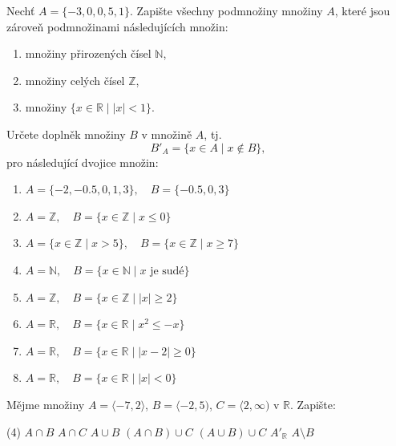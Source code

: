\documentclass[12pt,a4paper]{article}
\begin{document}
\begin{exercise}
Nechť $A = \{-3,0,0{,}5,1\}$.  
Zapište všechny podmnožiny množiny $A$, které jsou zároveň podmnožinami následujících množin:
\begin{enumerate}[label=\alph*)]
    \item množiny přirozených čísel $\mathbb{N}$,
    \item množiny celých čísel $\mathbb{Z}$,
    \item množiny $\{x \in \mathbb{R} \mid |x| < 1\}$.
\end{enumerate}
\end{exercise}


\setcounter{section}{2}
\begin{exercise}
Určete doplněk množiny $B$ v množině $A$, tj.
\[
B'_A = \{x \in A \mid x \notin B\},
\]
pro následující dvojice množin:
\begin{enumerate}[label=\alph*)]
    \item $A = \{-2,-0.5,0,1,3\}, \quad B = \{-0.5,0,3\}$
    \item $A = \mathbb{Z}, \quad B = \{x \in \mathbb{Z} \mid x \leq 0\}$
    \item $A = \{x \in \mathbb{Z} \mid x > 5\}, \quad B = \{x \in \mathbb{Z} \mid x \geq 7\}$
    \item $A = \mathbb{N}, \quad B = \{x \in \mathbb{N} \mid x \text{ je sudé}\}$
    \item $A = \mathbb{Z}, \quad B = \{x \in \mathbb{Z} \mid |x| \geq 2\}$
    \item $A = \mathbb{R}, \quad B = \{x \in \mathbb{R} \mid x^2 \leq -x\}$
    \item $A = \mathbb{R}, \quad B = \{x \in \mathbb{R} \mid |x-2| \geq 0\}$
    \item $A = \mathbb{R}, \quad B = \{x \in \mathbb{R} \mid |x| < 0\}$
\end{enumerate}
\end{exercise}


\begin{exercise}
Mějme množiny $A=\langle -7,2\rangle $, $B=\langle-2,5)$, $C=\langle2,\infty)$ v $\mathbb{R}$. Zapište:
\begin{tasks}(4)
    \task $A \cap B$
    \task $A \cap C$
    \task $A \cup B$
    \task $(A \cap B) \cup C$
    \task $(A \cup B) \cup C$
    \task {}
    \task $A'_{\mathbb{R}}$
    \task $A \setminus B$
\end{tasks}
\end{exercise}
\end{document}
